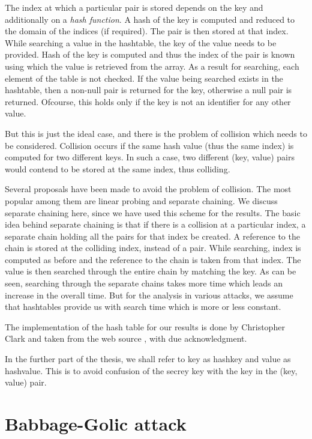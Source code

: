 The index at which a particular pair is stored depends on the key and additionally on a \textit{hash function}. A hash of the key is computed and reduced to the domain of the indices (if required). The pair is then stored at that index. While searching a value in the hashtable, the key of the value needs to be provided. Hash of the key is computed and thus the index of the pair is known using which the value is retrieved from the array. As a result for searching, each element of the table is not checked. If the value being searched exists in the hashtable, then a non-null pair is returned for the key, otherwise a null pair is returned. Ofcourse, this holds only if the key is not an identifier for any other value.

But this is just the ideal case, and there is the problem of collision which needs to be considered. Collision occurs if the same hash value (thus the same index) is computed for two different keys. In such a case, two different (key, value) pairs would contend to be stored at the same index, thus colliding. 

Several proposals have been made to avoid the problem of collision. The most popular among them are linear probing and separate chaining. We discuss separate chaining here, since we have used this scheme for the results. The basic idea behind separate chaining is that if there is a collision at a particular index, a separate chain holding all the pairs for that index be created. A reference to the chain is stored at the colliding index, instead of a pair. While searching, index is computed as before and the reference to the chain is taken from that index. The value is then searched through the entire chain by matching the key. As can be seen, searching through the separate chains takes more time which leads an increase in the overall time. But for the analysis in various attacks, we assume that hashtables provide us with search time which is more or less constant. 

The implementation of the hash table for our results is done by Christopher Clark and taken from the web source \cite{hash-table-impl}, with due acknowledgment. 

In the further part of the thesis, we shall refer to key as hashkey and value as hashvalue. This is to avoid confusion of the secrey key with the key in the (key, value) pair. 

\section{Babbage-Golic attack}
\label{sec:bg-keystream-attack}

